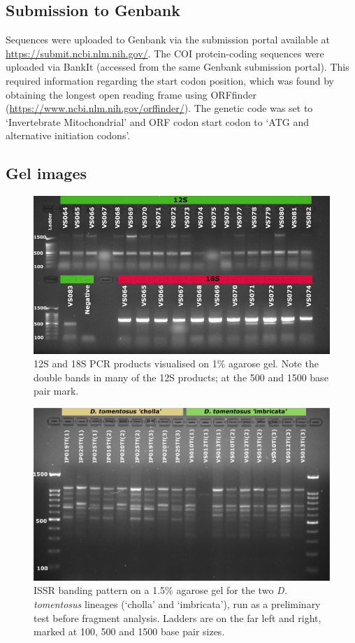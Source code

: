 \subsection{Submission to Genbank}
\label{appendix:genbank_submission}
Sequences were uploaded to Genbank via the submission portal available at \url{https://submit.ncbi.nlm.nih.gov/}. The COI protein-coding sequences were uploaded via BankIt (accessed from the same Genbank submission portal). This required information regarding the start codon position, which was found by obtaining the longest open reading frame using ORFfinder (\url{https://www.ncbi.nlm.nih.gov/orffinder/}). The genetic code was set to `Invertebrate Mitochondrial' and ORF codon start codon to `ATG and alternative initiation codons'.

\subsection{Gel images}

\begin{figure}[H]
\centering 
	\includegraphics[scale = 1]{Images/12S_gel.pdf}
	\caption{12S and 18S PCR products visualised on 1\% agarose gel. Note the double bands in many of the 12S products; at the 500 and 1500 base pair mark.}
	\label{fig:12Sgel}
\end{figure}

\begin{figure}[H]
	\centering
	\includegraphics[scale = 0.3]{Images/ISSR_gel_T.pdf}
	\caption{ISSR banding pattern on a 1.5\% agarose gel for the two \textit{D. tomentosus} lineages (`cholla' and `imbricata'), run as a preliminary test before fragment analysis. Ladders are on the far left and right, marked at 100, 500 and 1500 base pair sizes.}
	\label{fig:issrGel}
\end{figure}


